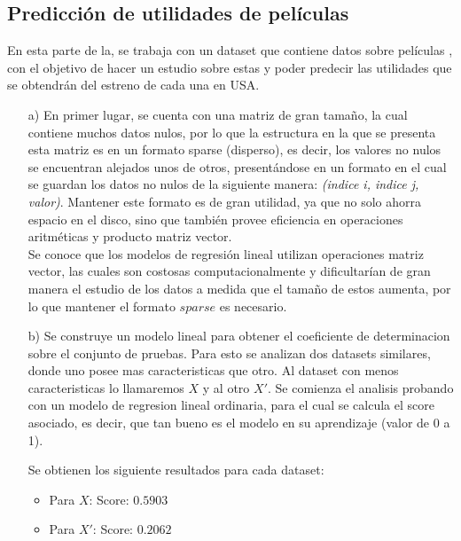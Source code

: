 \documentclass[10pt]{article}
\begin{document}
\subsection{Predicción de utilidades de películas}

En esta parte de la, se trabaja con un dataset que contiene datos sobre películas \cite{joshi2010movie}, con el objetivo de hacer un estudio sobre estas y poder predecir las utilidades que se obtendrán del estreno de cada una en USA. 

\begin{itemize}

\item[a)] En primer lugar, se cuenta con una matriz de gran tamaño, la cual contiene muchos datos nulos, por lo que la estructura en la que se presenta esta matriz es en un formato sparse (disperso), es decir, los valores no nulos se encuentran alejados unos de otros, presentándose en un formato en el cual se guardan los datos no nulos de la siguiente manera: \textit{(indice i, indice j, valor)}. Mantener este formato es de gran utilidad, ya que no solo ahorra espacio en el disco, sino que también provee eficiencia en operaciones aritméticas y producto matriz vector. \\
Se conoce que los modelos de regresión lineal utilizan operaciones matriz vector, las cuales son costosas computacionalmente y dificultarían de gran manera el estudio de los datos a medida que el tamaño de estos aumenta, por lo que mantener el formato $sparse$ es necesario.

\item[b)] Se construye un modelo lineal para obtener el coeficiente de determinacion sobre el conjunto de pruebas. Para esto se analizan dos datasets similares, donde uno posee mas caracteristicas que otro. Al dataset con menos caracteristicas lo llamaremos $X$ y al otro $X'$.
Se comienza el analisis probando con un modelo de regresion lineal ordinaria, para el cual se calcula el score asociado, es decir, que tan bueno es el modelo en su aprendizaje (valor de 0 a 1).

Se obtienen los siguiente resultados para cada dataset:

\begin{itemize}

\item Para $X$: Score: $0.5903$
\item Para $X'$: Score: $0.2062$  

\end{itemize}


\end{itemize}
\end{document}
